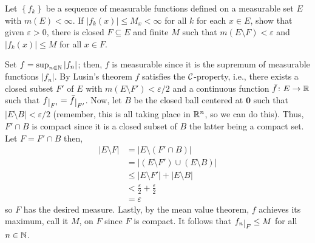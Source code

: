 \begin{problem}
  Let $\left\{f_k\right\}$ be a sequence of measurable functions defined on
  a measurable set $E$ with $m(E)<\infty$. If $|f_k(x)|\leq M_x<\infty$ for
  all $k$ for each $x\in E$, show that given $\varepsilon>0$, there is
  closed $F\subseteq E$ and finite $M$ such that
  $m(E\setminus F)<\varepsilon$ and $|f_k(x)|\leq M$ for all $x\in F$.
\end{problem}
\begin{solution}
  Set $f=\sup_{n\in\mathbb{N}} |f_n|$; then, $f$ is measurable since it is the
  supremum of measurable functions $|f_n|$. By Lusin's theorem $f$
  satisfies the $\mathcal{C}$-property, i.e., there exists a closed subset $F'$
  of $E$ with $m(E\setminus F')<\varepsilon/2$ and a continuous function
  $\bar f\colon E\to\mathbb{R}$ such that $f\restrict{F'}=\bar
  f\restrict{F'}$. Now, let $B$ be the closed ball centered at $\mathbf{0}$
  such that $|E\setminus B|<\varepsilon/2$ (remember, this is all taking
  place in $\mathbb{R}^n$, so we can do this). Thus, $F'\cap B$ is compact since
  it is a closed subset of $B$ the latter being a compact set. Let
  $F=F'\cap B$ then,
  \begin{align*}
    |E\setminus F|
    &=|E\setminus(F'\cap B)|\\
    &=|(E\setminus F')\cup(E\setminus B)|\\
    &\leq|E\setminus F'|+|E\setminus B|\\
    &<\frac{\varepsilon}{2}+\frac{\varepsilon}{2}\\
    &=\varepsilon
  \end{align*}
  so $F$ has the desired measure. Lastly, by the mean value theorem, $f$
  achieves its maximum, call it $M$, on $F$ since $F$ is compact. It
  follows that $f_n\restrict{F}\leq M$ for all $n\in\mathbb{N}$.
\end{solution}

